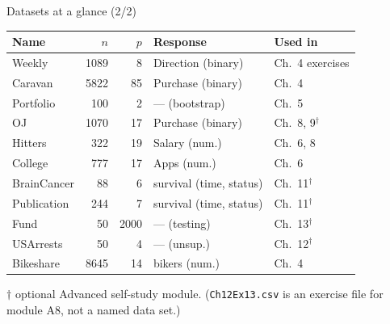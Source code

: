 \documentclass[aspectratio=169,11pt]{beamer}
\begin{document}
\begin{frame}{Datasets at a glance (2/2)}
  \footnotesize
  \begin{tabular}{lrrll}
    \toprule
    \textbf{Name} & $n$ & $p$ & \textbf{Response} & \textbf{Used in} \\
    \midrule
    Weekly       & 1089 &   8 & Direction (binary) & Ch.~4 exercises \\
    Caravan      & 5822 &  85 & Purchase (binary)  & Ch.~4 \\
    Portfolio    &  100 &   2 & --- (bootstrap)    & Ch.~5 \\
    OJ           & 1070 &  17 & Purchase (binary)  & Ch.~8, 9$^{\dagger}$ \\
    Hitters      &  322 &  19 & Salary (num.)      & Ch.~6, 8 \\
    College      &  777 &  17 & Apps (num.)        & Ch.~6 \\
    BrainCancer  &   88 &   6 & survival (time, status) & Ch.~11$^{\dagger}$ \\
    Publication  &  244 &   7 & survival (time, status) & Ch.~11$^{\dagger}$ \\
    Fund         &   50 & 2000 & --- (testing)      & Ch.~13$^{\dagger}$ \\
    USArrests    &   50 &   4 & --- (unsup.)       & Ch.~12$^{\dagger}$ \\
    Bikeshare    & 8645 &  14 & bikers (num.)      & Ch.~4 \\
    \bottomrule
  \end{tabular}
  \vspace{1mm}

  {\scriptsize $\dagger$ optional Advanced self-study module. \quad
  (\texttt{Ch12Ex13.csv} is an exercise file for module A8, not a named data set.)}
\end{frame}
\end{document}
